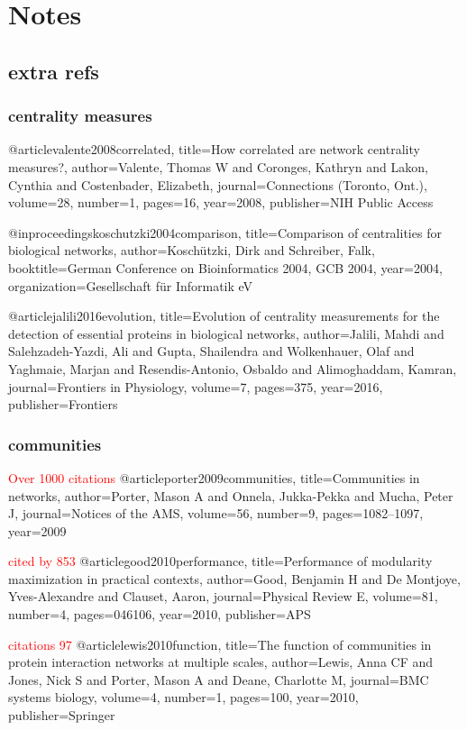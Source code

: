 \chapter{Notes}
\section{extra refs}
\subsection{centrality measures}
@article{valente2008correlated,
  title={How correlated are network centrality measures?},
  author={Valente, Thomas W and Coronges, Kathryn and Lakon, Cynthia and Costenbader, Elizabeth},
  journal={Connections (Toronto, Ont.)},
  volume={28},
  number={1},
  pages={16},
  year={2008},
  publisher={NIH Public Access}
}

@inproceedings{koschutzki2004comparison,
  title={Comparison of centralities for biological networks},
  author={Kosch{\"u}tzki, Dirk and Schreiber, Falk},
  booktitle={German Conference on Bioinformatics 2004, GCB 2004},
  year={2004},
  organization={Gesellschaft f{\"u}r Informatik eV}
}

@article{jalili2016evolution,
  title={Evolution of centrality measurements for the detection of essential proteins in biological networks},
  author={Jalili, Mahdi and Salehzadeh-Yazdi, Ali and Gupta, Shailendra and Wolkenhauer, Olaf and Yaghmaie, Marjan and Resendis-Antonio, Osbaldo and Alimoghaddam, Kamran},
  journal={Frontiers in Physiology},
  volume={7},
  pages={375},
  year={2016},
  publisher={Frontiers}
}

\subsection{communities}
\textcolor{red}{Over 1000 citations}
@article{porter2009communities,
  title={Communities in networks},
  author={Porter, Mason A and Onnela, Jukka-Pekka and Mucha, Peter J},
  journal={Notices of the AMS},
  volume={56},
  number={9},
  pages={1082--1097},
  year={2009}
}

\textcolor{red}{cited by 853}
@article{good2010performance,
  title={Performance of modularity maximization in practical contexts},
  author={Good, Benjamin H and De Montjoye, Yves-Alexandre and Clauset, Aaron},
  journal={Physical Review E},
  volume={81},
  number={4},
  pages={046106},
  year={2010},
  publisher={APS}
}

\textcolor{red}{citations 97}
@article{lewis2010function,
  title={The function of communities in protein interaction networks at multiple scales},
  author={Lewis, Anna CF and Jones, Nick S and Porter, Mason A and Deane, Charlotte M},
  journal={BMC systems biology},
  volume={4},
  number={1},
  pages={100},
  year={2010},
  publisher={Springer}
}

